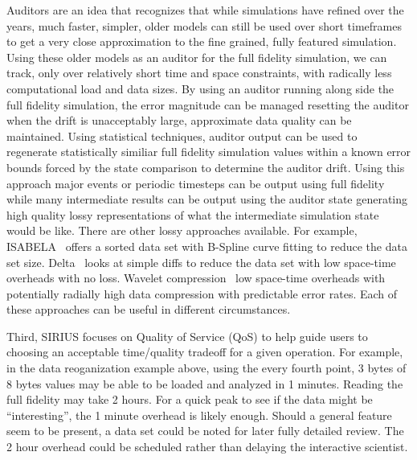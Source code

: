 Auditors are an idea that recognizes that while simulations have refined over
the years, much faster, simpler, older models can still be used over short
timeframes to get a very close approximation to the fine grained, fully
featured simulation. Using these older models as an auditor for the full
fidelity simulation, we can track, only over relatively short time and space
constraints, with radically less computational load and data sizes. By using an
auditor running along side the full fidelity simulation, the error magnitude
can be managed resetting the auditor when the drift is unacceptably large,
approximate data quality can be maintained. Using statistical techniques,
auditor output can be used to regenerate statistically similiar full fidelity
simulation values within a known error bounds forced by the state comparison to
determine the auditor drift. Using this approach major events or periodic
timesteps can be output using full fidelity while many intermediate results can
be output using the auditor state generating high quality lossy representations
of what the intermediate simulation state would be like. There are other lossy
approaches available. For example, ISABELA~\cite{lakshminarasimhan:2011:isabela} offers a sorted
data set with B-Spline curve fitting to reduce the data set size.
Delta~\cite{jeanbaptiste:2015:delta} looks at simple diffs to reduce the data set with low
space-time overheads with no loss. Wavelet compression~\cite{klappenecker:1995:wavelet} low
space-time overheads with potentially radially high data compression with
predictable error rates. Each of these approaches can be useful in different
circumstances.

Third, SIRIUS focuses on Quality of Service (QoS) to help guide users to
choosing an acceptable time/quality tradeoff for a given operation. For
example, in the data reoganization example above, using the every fourth point,
3 bytes of 8 bytes values may be able to be loaded and analyzed in 1 minutes.
Reading the full fidelity may take 2 hours. For a quick peak to see if the data
might be ``interesting'', the 1 minute overhead is likely enough. Should a
general feature seem to be present, a data set could be noted for later fully
detailed review. The 2 hour overhead could be scheduled rather than delaying
the interactive scientist.

